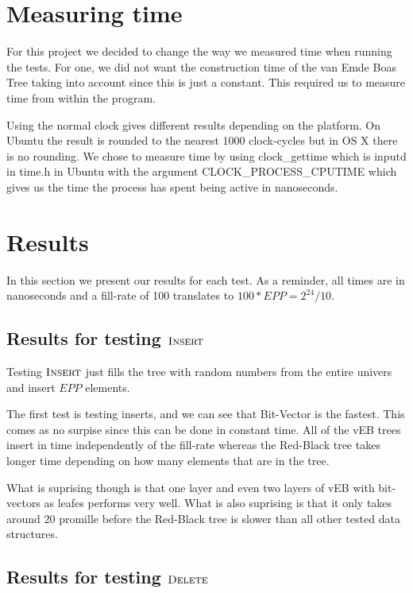 \documentclass[oneside,11pt,openright]{report}
\newcommand{\Insert}{\textsc{Insert}}
\newcommand{\Delete}{\textsc{Delete}}
\begin{document}
\section{Measuring time}

For this project we decided to change the way we measured time when running the tests. For one, we did not want the construction time of the van Emde Boas Tree taking into account since this is just a constant. This required us to measure time from within the program.

Using the normal clock gives different results depending on the platform. On Ubuntu the result is rounded to the nearest 1000 clock-cycles but in OS X there is no rounding. We chose to measure time by using clock\_gettime which is inputd in time.h in Ubuntu with the argument CLOCK\_PROCESS\_CPUTIME which gives us the time the process has spent being active in nanoseconds.

\section{Results}

In this section we present our results for each test. As a reminder, all times are in nanoseconds and a fill-rate of 100 translates to $100 * EPP = 2^{24}/10$.

\subsection{Results for testing $\Insert$}

Testing $\Insert$ just fills the tree with random numbers from the entire univers and insert $EPP$ elements.



The first test is testing inserts, and we can see that Bit-Vector is the fastest. This comes as no surpise since this can be done in constant time. All of the vEB trees insert in time independently of the fill-rate whereas the Red-Black tree takes longer time depending on how many elements that are in the tree.

What is suprising though is that one layer and even two layers of vEB with bit-vectors as leafes performs very well. What is also suprising is that it only takes around 20 promille before the Red-Black tree is slower than all other tested data structures.

\subsection{Results for testing $\Delete$}
\end{document}
